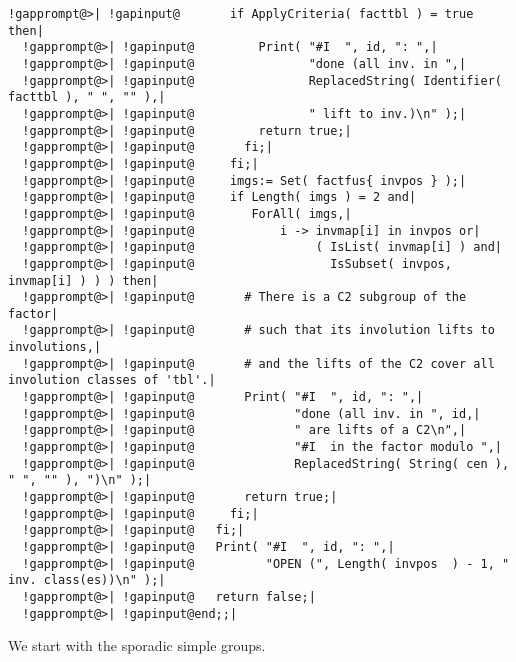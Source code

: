 \documentclass[a4paper,11pt]{report}
\begin{document}
{{{\begin{Verbatim}[commandchars=!@|,fontsize=\small,frame=single,label=Example]
  !gapprompt@>| !gapinput@       if ApplyCriteria( facttbl ) = true then|
  !gapprompt@>| !gapinput@         Print( "#I  ", id, ": ",|
  !gapprompt@>| !gapinput@                "done (all inv. in ",|
  !gapprompt@>| !gapinput@                ReplacedString( Identifier( facttbl ), " ", "" ),|
  !gapprompt@>| !gapinput@                " lift to inv.)\n" );|
  !gapprompt@>| !gapinput@         return true;|
  !gapprompt@>| !gapinput@       fi;|
  !gapprompt@>| !gapinput@     fi;|
  !gapprompt@>| !gapinput@     imgs:= Set( factfus{ invpos } );|
  !gapprompt@>| !gapinput@     if Length( imgs ) = 2 and|
  !gapprompt@>| !gapinput@        ForAll( imgs,|
  !gapprompt@>| !gapinput@            i -> invmap[i] in invpos or|
  !gapprompt@>| !gapinput@                 ( IsList( invmap[i] ) and|
  !gapprompt@>| !gapinput@                   IsSubset( invpos, invmap[i] ) ) ) then|
  !gapprompt@>| !gapinput@       # There is a C2 subgroup of the factor|
  !gapprompt@>| !gapinput@       # such that its involution lifts to involutions,|
  !gapprompt@>| !gapinput@       # and the lifts of the C2 cover all involution classes of 'tbl'.|
  !gapprompt@>| !gapinput@       Print( "#I  ", id, ": ",|
  !gapprompt@>| !gapinput@              "done (all inv. in ", id,|
  !gapprompt@>| !gapinput@              " are lifts of a C2\n",|
  !gapprompt@>| !gapinput@              "#I  in the factor modulo ",|
  !gapprompt@>| !gapinput@              ReplacedString( String( cen ), " ", "" ), ")\n" );|
  !gapprompt@>| !gapinput@       return true;|
  !gapprompt@>| !gapinput@     fi;|
  !gapprompt@>| !gapinput@   fi;|
  !gapprompt@>| !gapinput@   Print( "#I  ", id, ": ",|
  !gapprompt@>| !gapinput@          "OPEN (", Length( invpos  ) - 1, " inv. class(es))\n" );|
  !gapprompt@>| !gapinput@   return false;|
  !gapprompt@>| !gapinput@end;;|
\end{Verbatim}
 

 We start with the sporadic simple groups. 

}}}
\end{document}
